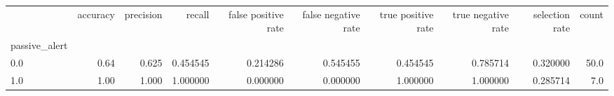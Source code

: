 \begin{tabular}{lrrrrrrrrr}
\toprule
{} &  accuracy &  precision &    recall &  false positive rate &  false negative rate &  true positive rate &  true negative rate &  selection rate &  count \\
passive\_alert &           &            &           &                      &                      &                     &                     &                 &        \\
\midrule
0.0           &      0.64 &      0.625 &  0.454545 &             0.214286 &             0.545455 &            0.454545 &            0.785714 &        0.320000 &   50.0 \\
1.0           &      1.00 &      1.000 &  1.000000 &             0.000000 &             0.000000 &            1.000000 &            1.000000 &        0.285714 &    7.0 \\
\bottomrule
\end{tabular}
